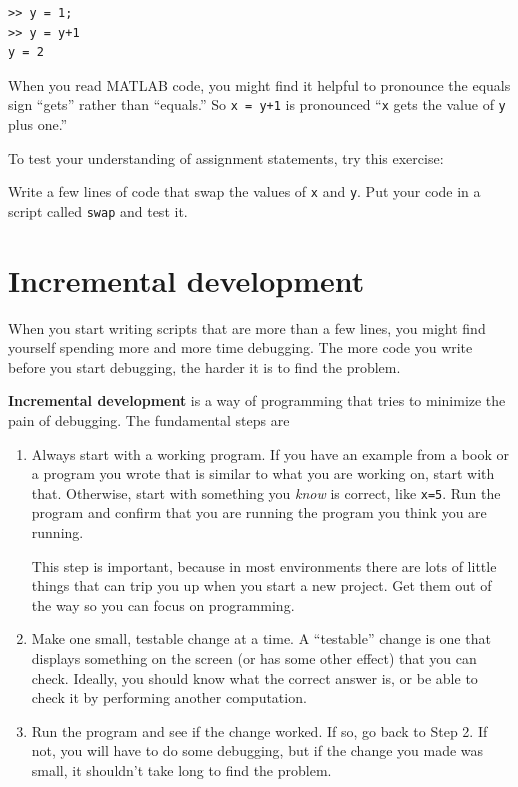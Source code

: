 \documentclass[
]{book}
\begin{document}
\begin{verbatim}
>> y = 1;
>> y = y+1
y = 2
\end{verbatim}

When you read MATLAB code, you might find it helpful to pronounce
the equals sign ``gets'' rather than ``equals.''  So {\tt x = y+1}
is pronounced ``{\tt x} gets the value of {\tt y} plus one.''

To test your understanding of assignment statements, try this
exercise:

\begin{ex}
Write a few lines of code that swap the values of
{\tt x} and {\tt y}.  Put your code in a script called {\tt swap}
and test it.
\end{ex}

\section{Incremental development}

When you start writing scripts that are more than a few lines, you
might find yourself spending more and more time debugging.  The more
code you write before you start debugging, the harder it is to find
the problem.

{\bf Incremental development} is a way of programming that tries
to minimize the pain of debugging.  The fundamental steps are

\begin{enumerate}

\item Always start with a working program.  If you have an
example from a book or a program you wrote that is similar to
what you are working on, start with that.  Otherwise, start with
something you {\em know} is correct, like {\tt x=5}.  Run the program
and confirm that you are running the program you think you are
running.

This step is important, because in most environments there
are lots of little things that can trip you up when you start a new
project.  Get them out of the way so you can focus on programming.

\item Make one small, testable change at a time.  A ``testable''
change is one that displays something on the screen (or has some
other effect) that you can check.  Ideally, you should know what
the correct answer is, or be able to check it by performing another
computation.

\item Run the program and see if the change worked.  If so, go back
to Step 2.  If not, you will have to do some debugging, but if the
change you made was small, it shouldn't take long to find the problem.

\end{enumerate}
\end{document}
